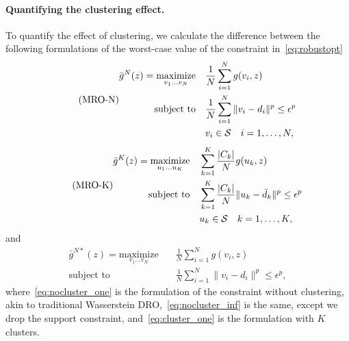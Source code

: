 {\paragraph{Quantifying the clustering effect.}%
\label{par:quantify_clustering_effect_}
To quantify the effect of clustering, we calculate the difference between the following formulations of the worst-case value of the constraint in~\eqref{eq:robustopt}
\begin{equation}
	\tag{MRO-N}
	\begin{aligned}
	\label{eq:nocluster_one}
	\bar{g}^N(z) = \underset{v_1\dots v_N}{\text{maximize}} &\quad\frac{1}{N} \sum_{i=1} ^N g(v_i, z) \\
	\mbox{subject to} & \quad \frac{1}{N} \sum_{i=1} ^N  \| v_i - d_i \|^p \le \epsilon^p\\
	& \quad v_i\in \mathcal{S} \quad i = 1,\dots,N,
	\end{aligned}
\end{equation}
\begin{equation}
	\tag{MRO-K}
	\label{eq:cluster_one}
	\begin{aligned}
		\bar{g}^K(z) = \underset{u_1\dots u_K}{\text{maximize}} &\quad  \sum_{k=1} ^K  \frac{|C_k|}{N} g(u_k, z) \\
	\mbox{subject to} & \quad\sum_{k=1} ^K \frac{|C_k|}{N}  \| u_k - \bar{d}_k \|^p \le \epsilon^p\\
	& \quad u_k\in \mathcal{S} \quad k = 1,\dots,K,
	\end{aligned}
\end{equation}
and
\begin{equation}
	\tag{MRO-N*}
	\label{eq:nocluster_inf}
	\begin{aligned}
		\bar{g}^{N*}(z) = \underset{v_1\dots v_N}{\text{maximize}} &\quad\frac{1}{N} \sum_{i=1} ^N g(v_i, z) \\
		\mbox{subject to} & \quad \frac{1}{N} \sum_{i=1} ^N  \| v_i - d_i \|^p \le \epsilon^p,
		\end{aligned}
\end{equation}
where~\eqref{eq:nocluster_one} is the formulation of the constraint without clustering, akin to traditional Wasserstein \gls{DRO},~\eqref{eq:nocluster_inf} is the same, except we drop the support constraint, and~\eqref{eq:cluster_one} is the formulation with $K$ clusters.
}
